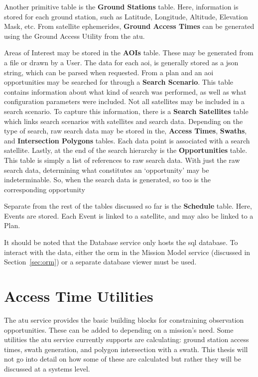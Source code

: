 Another primitive table is the \textbf{Ground Stations} table. Here, information
is stored for each ground station, such as Latitude, Longitude, Altitude,
Elevation Mask, etc. From satellite ephemerides, \textbf{Ground Access Times}
can be generated using the Ground Access Utility from the \gls{atu}.

Areas of Interest may be stored in the \textbf{AOIs} table. These may be
generated from a file or drawn by a User. The data for each \gls{aoi}, is
generally stored as a \gls{json} string, which can be parsed when requested.
From a plan and an \gls{aoi} opportunities may be searched for through a
\textbf{Search Scenario}.  This table contains information about what kind of
search was performed, as well as what configuration parameters were included.
Not all satellites may be included in a search scenario. To capture this
information, there is a \textbf{Search Satellites} table which links search
scenarios with satellites and search data.  Depending on the type of search,
raw search data may be stored in the, \textbf{Access Times}, \textbf{Swaths},
and \textbf{Intersection Polygons} tables. Each data point is associated with a
search satellite.  Lastly, at the end of the search hierarchy is the
\textbf{Opportunities} table.  This table is simply a list of references to raw
search data. With just the raw search data, determining what constitutes an
`opportunity' may be indeterminable.  So, when the search data is generated, so
too is the corresponding opportunity

Separate from the rest of the tables discussed so far is the \textbf{Schedule}
table. Here, Events are stored. Each Event is linked to a satellite, and may
also be linked to a Plan.

It should be noted that the Database service only hosts the \gls{sql} database.
To interact with the data, either the \acrshort{orm} in the Mission Model
service (discussed in Section~\ref{sec:orm}) or a separate database viewer must
be used.




\section{Access Time Utilities}\label{sec:atu}

The \gls{atu} service provides the basic building blocks for constraining
observation opportunities. These can be added to depending on a mission’s need.
Some utilities the \gls{atu} service currently supports are calculating: ground
station access times, swath generation, and polygon intersection with a swath.
This thesis will not go into detail on how some of these are calculated but
rather they will be discussed at a systems level.

